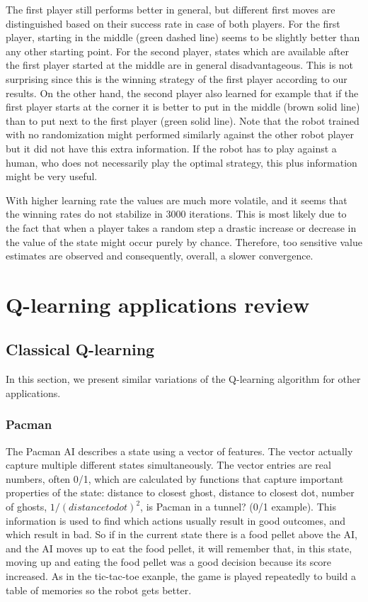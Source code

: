 \documentclass[fleqn]{article}
\begin{document}
The first player still performs better in general, but different first moves are distinguished  based on their success rate in case of both players. For the first player, starting in the middle (green dashed line) seems to be slightly better than any other starting point. For the second player,  states which are available after the first player started at the middle are in general disadvantageous. This is not surprising since this is the winning strategy of the first player according to our results. On the other hand, the second player also learned for example that if the first player starts at the corner it is better to put in the middle (brown solid line) than to put next to the first player (green solid line).  Note that the robot trained with no randomization might performed similarly against the other robot player but it did not have this extra information.  If the robot has to play against a human, who does not necessarily play the optimal strategy, this plus information might be very useful. 

With higher learning rate the values are much more volatile, and it seems that the winning rates do not stabilize in 3000 iterations. This is most likely due to the fact that when a player takes a random step a drastic increase or decrease in the value of the state might occur purely by chance. Therefore, too sensitive value estimates are observed and consequently, overall, a slower convergence.

\section{Q-learning applications review}

\subsection{Classical Q-learning}
In this section, we present similar variations of the Q-learning algorithm for other applications.

\subsubsection{Pacman}
The Pacman AI describes a state using a vector of features. The vector actually capture multiple different states simultaneously. The vector entries are real numbers, often 0/1, which are calculated by functions that capture important properties of the state: distance to closest ghost, distance to closest dot, number of ghosts, $1/(distance to dot)^2$, is Pacman in a tunnel? (0/1 example). This information is used to find which actions usually result in good outcomes, and which result in bad. So if in the current state there is a food pellet above the AI, and the AI moves up to eat the food pellet, it will remember that, in this state, moving up and eating the food pellet was a good decision because its score increased. As in the tic-tac-toe exanple, the game is played repeatedly to build a table of memories so the robot gets better. 
\end{document}
